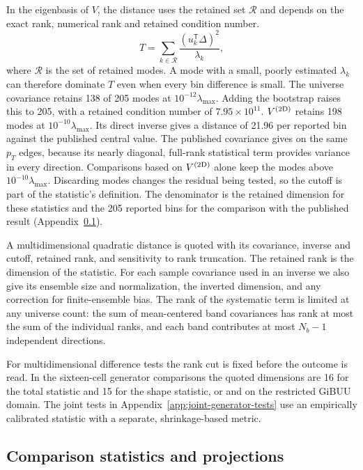 In the eigenbasis of $V$, the distance uses the retained set $\mathcal R$ and depends on the exact rank, numerical rank and retained condition number.
\begin{equation}
  T=\sum_{k\in\mathcal R}\frac{(u_k^{\mathsf T}\Delta)^2}{\lambda_k},
  \label{eq:app-eigenmode-distance}
\end{equation}
where $\mathcal R$ is the set of retained modes. A mode with a small, poorly estimated $\lambda_k$ can therefore dominate $T$ even when every bin difference is small. The universe covariance retains 138 of 205 modes at $10^{-12}\lambda_{\max}$. Adding the bootstrap raises this to 205, with a retained condition number of $7.95\times10^{11}$. $V^{(2\mathrm{D})}$ retains 198 modes at $10^{-10}\lambda_{\max}$. Its direct inverse gives a distance of 21.96 per reported bin against the published central value. The published covariance gives \chiPaperOurEdges{} on the same $p_T$ edges, because its nearly diagonal, full-rank statistical term provides variance in every direction. Comparisons based on $V^{(2\mathrm{D})}$ alone keep the modes above $10^{-10}\lambda_{\max}$. Discarding modes changes the residual being tested, so the cutoff is part of the statistic's definition. The denominator is the retained dimension for these statistics and the 205 reported bins for the comparison with the published result (Appendix~\ref{app:comparison-closure-coverage}).

A multidimensional quadratic distance is quoted with its covariance, inverse and cutoff, retained rank, and sensitivity to rank truncation. The retained rank is the dimension of the statistic. For each sample covariance used in an inverse we also give its ensemble size and normalization, the inverted dimension, and any correction for finite-ensemble bias. The rank of the systematic term is limited at any universe count: the sum of mean-centered band covariances has rank at most the sum of the individual ranks, and each band contributes at most $N_b-1$ independent directions.

For multidimensional difference tests the rank cut is fixed before the outcome is read. In the sixteen-cell generator comparisons the quoted dimensions are 16 for the total statistic and 15 for the shape statistic, or  and  on the restricted GiBUU domain. The joint tests in Appendix~\ref{app:joint-generator-tests} use an empirically calibrated statistic with a separate, shrinkage-based metric.

\subsection{Comparison statistics and projections}
\label{app:comparison-closure-coverage}
\label{sec:compare}
\label{sec:205bins}
\label{sec:chisq}
\label{sec:pull}
\label{sec:shape}
\label{sec:assemble}

